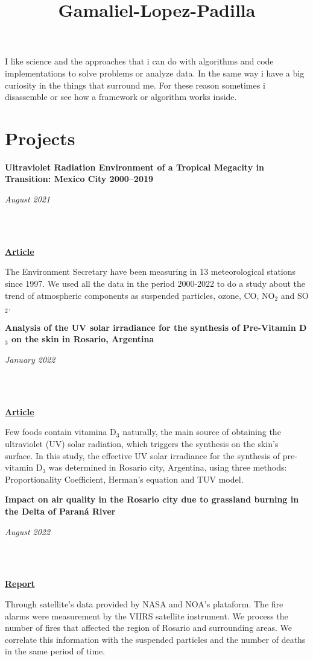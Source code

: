 \documentclass[a3paper]{adcv_color}
\title{Gamaliel-Lopez-Padilla}
\newcommand{\proyect}[3]{\begin{minipage}{1\linewidth}
    \begin{minipage}{0.8\linewidth}
      \textbf{#1}
    \end{minipage}
    \begin{minipage}{0.19\linewidth}
      \begin{flushright}
        \vspace{#3cm}
        \textit{#2}
      \end{flushright}
    \end{minipage}\\
  \end{minipage}
  \vspace{0.1cm}\\
}
\begin{document}
\changefontsizes{15.5pt}
I like science and the approaches that i can do with algorithms and code implementations to solve problems or analyze data. In the same way i have a big curiosity in the things that surround me. For these reason sometimes i disassemble or see how a framework or algorithm works inside.

\section{Projects}
\begin{multicols}{2}

  \proyect{\textbf{Ultraviolet Radiation Environment of a Tropical Megacity in Transition: Mexico City 2000–2019}}{August 2021}{-0.6}
  \href{https://pubs.acs.org/doi/10.1021/acs.est.0c08515}{\textbf{Article}}

  The Environment Secretary have been measuring in 13 meteorological stations since 1997. We used all the data in the period 2000-2022 to do a study about the trend of atmospheric components as suspended particles, ozone, CO, NO$_2$ and SO$_2$.\\

  \proyect{\textbf{Analysis of the UV solar irradiance for the synthesis of Pre-Vitamin D$_3$ on the skin in Rosario, Argentina}}{January 2022}{-0.8}
  \href{https://anales.fisica.org.ar/journal/index.php/analesafa/article/view/2318}{\textbf{Article}}

  Few  foods  contain  vitamina  D$_3$ naturally,  the  main  source  of  obtaining  the  ultraviolet (UV) solar radiation, which triggers the synthesis on the skin’s surface. In this study, the effective UV solar irradiance for the synthesis of pre-vitamin D$_3$ was determined in Rosario city, Argentina, using three methods: Proportionality Coefficient, Herman’s equation and TUV model.\\

  \proyect{\textbf{Impact on air quality in the Rosario city due to grassland burning in the Delta of Paraná River}}{August 2022}{-0.6}
  \href{https://rephip.unr.edu.ar/handle/2133/24201}{\textbf{Report}}

  Through satellite's data provided by NASA and NOA's plataform. The fire alarms were measurement by the VIIRS satellite instrument. We process the number of fires that affected the region of Rosario and surrounding areas. We correlate this information with the suspended particles and the number of deaths in the same period of time.\\


\end{multicols}
\end{document}
